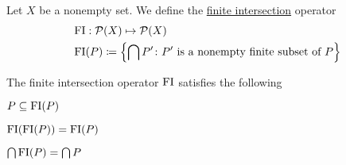 \begin{definition}\label{def:finite_intersection_operator}\cite[27]{Lectures:general_topology}
  Let $X$ be a nonempty set. We define the \uline{finite intersection} operator
  \begin{align*}
    &\operatorname{FI}: \operatorname{\mathcal P}(X) \mapsto \operatorname{\mathcal P}(X) \\
    &\operatorname{FI}(P) \coloneqq \left\{ \bigcap P' \colon P' \text{ is a nonempty finite subset of } P \right\}
  \end{align*}
\end{definition}

\begin{proposition}\label{thm:finite_intersection_properties}\cite[27]{Lectures:general_topology}
  The finite intersection operator $\operatorname{FI}$ satisfies the following
  \begin{defenum}
    \item $P \subseteq \operatorname{FI}(P)$
    \item $\operatorname{FI}(\operatorname{FI}(P)) = \operatorname{FI}(P)$
    \item $\bigcap \operatorname{FI}(P) = \bigcap P$
  \end{defenum}
\end{proposition}
